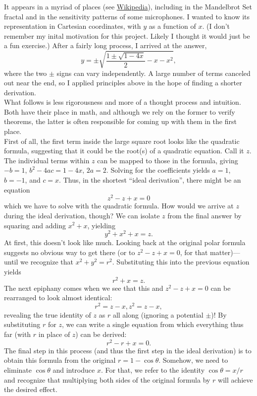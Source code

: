 \documentclass{article}
\begin{document}
It appears in a myriad of places (see \href{https://en.wikipedia.org/wiki/Cardioid#Properties}{Wikipedia}),
including in the Mandelbrot Set fractal and in the sensitivity patterns of some microphones.
I wanted to know its representation in Cartesian coordinates, with $y$ as a function of $x$.
(I don't remember my inital motivation for this project.
Likely I thought it would just be a fun exercise.)
After a fairly long process, I arrived at the answer,
\[y = \pm\sqrt{\frac{1\pm\sqrt{1-4x}}{2}-x-x^2},\]
where the two $\pm$ signs can vary independently.
A large number of terms canceled out near the end,
so I applied principles above
in the hope of finding a shorter derivation.\\

What follows is less rigorousness and more of a thought process and intuition.
Both have their place in math, and although we rely on the former to verify theorems,
the latter is often responsible for coming up with them in the first place.\\

First of all, the first term inside the large square root looks like the quadratic formula,
suggesting that it could be the root(s) of a quadratic equation.
Call it $z$.
The individual terms within $z$ can be mapped to those in the formula, giving
$-b=1$, $b^2-4ac=1-4x$, $2a=2$.
Solving for the coefficients yields $a=1$, $b=-1$, and $c=x$.
Thus, in the shortest ``ideal derivation'', there might be an equation
\[z^2-z+x=0\]
which we have to solve with the quadratic formula.
How would we arrive at $z$ during the ideal derivation, though?
We can isolate $z$ from the final answer by squaring and adding $x^2+x$, yielding
\[y^2+x^2+x=z.\]
At first, this doesn't look like much.
Looking back at the original polar formula
suggests no obvious way to get there
(or to $z^2-z+x=0$, for that matter)---until we recognize that $x^2+y^2=r^2$.
Substituting this into the previous equation yields
\[r^2+x=z.\]
The next epiphany comes when we see that this and $z^2-z+x=0$ can be rearranged to look almost identical:
\[r^2=z-x, z^2=z-x,\]
revealing the true identity of $z$ as $r$ all along
(ignoring a potential $\pm$)!
By substituting $r$ for $z$, we can write a single equation from which everything thus far (with $r$ in place of $z$) can be derived:
\[r^2-r+x=0.\]
The final step in this process (and thus the first step in the ideal derivation)
is to obtain this formula from the original $r=1-\cos\theta$.
Somehow, we need to eliminate $\cos\theta$ and introduce $x$.
For that, we refer to the identity $\cos\theta=x/r$
and recognize that multiplying both sides of the original formula by $r$
will achieve the desired effect.\\
\end{document}
